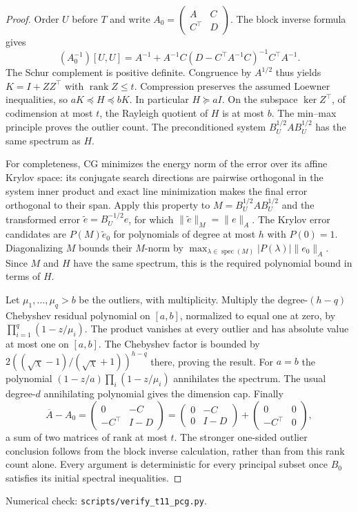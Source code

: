 \documentclass[11pt]{article}
\DeclareMathOperator{\spec}{spec}
\begin{document}
\begin{proof}
Order $U$ before $T$ and write
$A_0=\left(\begin{smallmatrix}A&C\\C^\top&D\end{smallmatrix}\right)$.
The block inverse formula gives
\[
 (A_0^{-1})[U,U]
 =A^{-1}+A^{-1}C(D-C^\top A^{-1}C)^{-1}C^\top A^{-1}.
\]
The Schur complement is positive definite. Congruence by $A^{1/2}$
thus yields $K=I+ZZ^\top$ with $\operatorname{rank}Z\leq t$.
Compression preserves the assumed Loewner inequalities, so
$aK\preceq H\preceq bK$. In particular $H\succeq aI$.
On the subspace $\ker Z^\top$, of codimension at most $t$,
the Rayleigh quotient of $H$ is at most $b$. The min--max
principle proves the outlier count. The preconditioned system
$B_U^{1/2}AB_U^{1/2}$ has the same spectrum as $H$.

For completeness, CG minimizes the energy norm of the error over
its affine Krylov space: its conjugate search directions are
pairwise orthogonal in the system inner product and exact line
minimization makes the final error orthogonal to their span.
Apply this property to $M=B_U^{1/2}AB_U^{1/2}$ and the transformed
error $\widetilde e=B_U^{-1/2}e$, for which
$\|\widetilde e\|_M=\|e\|_A$. The Krylov error candidates are
$P(M)\widetilde e_0$ for polynomials of degree at most $h$ with
$P(0)=1$. Diagonalizing $M$ bounds their $M$-norm by
$\max_{\lambda\in\spec(M)}|P(\lambda)|\|e_0\|_A$.
Since $M$ and $H$ have the same spectrum, this is the required
polynomial bound in terms of $H$.

Let $\mu_1,\ldots,\mu_q>b$ be the outliers, with multiplicity.
Multiply the degree-$(h-q)$ Chebyshev residual polynomial on
$[a,b]$, normalized to equal one at zero, by
$\prod_{i=1}^q(1-z/\mu_i)$. The product vanishes at every outlier
and has absolute value at most one on $[a,b]$. The Chebyshev
factor is bounded by
$2((\sqrt\chi-1)/(\sqrt\chi+1))^{h-q}$ there, proving the result.
For $a=b$ the polynomial $(1-z/a)\prod_i(1-z/\mu_i)$ annihilates
the spectrum. The usual degree-$d$ annihilating polynomial gives
the dimension cap. Finally
\[
 \overline A-A_0=
 \begin{pmatrix}0&-C\\-C^\top&I-D\end{pmatrix}
 =\begin{pmatrix}0&-C\\0&I-D\end{pmatrix}
  +\begin{pmatrix}0&0\\-C^\top&0\end{pmatrix},
\]
a sum of two matrices of rank at most $t$. The stronger one-sided
outlier conclusion follows from the block inverse calculation,
rather than from this rank count alone. Every argument is
deterministic for every principal subset once $B_0$ satisfies its
initial spectral inequalities.
\end{proof}
\noindent Numerical check: \texttt{scripts/verify\_t11\_pcg.py}.
\end{document}
